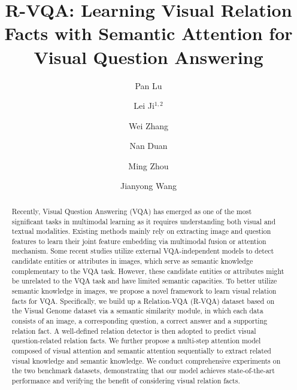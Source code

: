 \documentclass[sigconf]{acmart}
\begin{document}
\title{R-VQA: Learning Visual Relation Facts with Semantic Attention for Visual Question Answering}


\author{Pan Lu}

\author{Lei Ji$^{1,2}$}

\author{Wei Zhang}

\author{Nan Duan}

\author{Ming Zhou}

\author{Jianyong Wang}

\renewcommand{\shortauthors}{P. Lu et al.}


\begin{abstract}

Recently, Visual Question Answering (VQA) has emerged as one of the most significant tasks in multimodal learning as it requires understanding both visual and textual modalities. Existing methods mainly rely on extracting image and question features to learn their joint feature embedding via multimodal fusion or attention mechanism. Some recent studies utilize external VQA-independent models to detect candidate entities or attributes in images, which serve as semantic knowledge complementary to the VQA task. However, these candidate entities or attributes might be unrelated to the VQA task and have limited semantic capacities. To better utilize semantic knowledge in images, we propose a novel framework to learn visual relation facts for VQA. Specifically, we build up a Relation-VQA (R-VQA) dataset based on the Visual Genome dataset via a semantic similarity module, in which each data consists of an image, a corresponding question, a correct answer and a supporting relation fact. A well-defined relation detector is then adopted to predict visual question-related relation facts. We further propose a multi-step attention model composed of visual attention and semantic attention sequentially to extract related visual knowledge and semantic knowledge. We conduct comprehensive experiments on the two benchmark datasets, demonstrating that our model achieves state-of-the-art performance and verifying the benefit of considering visual relation facts.




\end{abstract}
\end{document}
